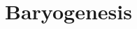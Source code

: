 \documentclass[prd,showpcs,amsmath,amssymb,nofootinbib,preprintnumbers,balancelastpage,longbibliography,superscriptaddress,notitlepage]{revtex4}
\def\bea{\begin{eqnarray}}
\def\eea{\end{eqnarray}}
\def\bea{\begin{eqnarray}}
\def\eea{\end{eqnarray}}
\begin{document}
% 
% 


\section{Baryogenesis}
\end{document}

